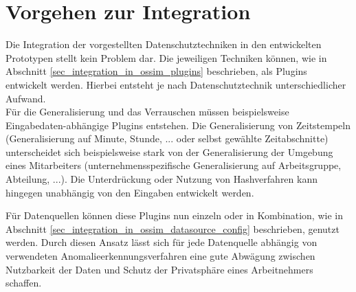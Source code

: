 \section{Vorgehen zur Integration}

Die Integration der vorgestellten Datenschutztechniken in den entwickelten Prototypen stellt kein Problem dar. Die jeweiligen Techniken können, wie in Abschnitt \ref{sec_integration_in_ossim_plugins} beschrieben, als Plugins entwickelt werden. Hierbei entsteht je nach Datenschutztechnik unterschiedlicher Aufwand.\\
Für die Generalisierung und das Verrauschen müssen beispielsweise Eingabedaten-abhängige Plugins entstehen. Die Generalisierung von Zeitstempeln (Generalisierung auf Minute, Stunde, ... oder selbst gewählte Zeitabschnitte) unterscheidet sich beispielsweise stark von der Generalisierung der Umgebung eines Mitarbeiters (unternehmensspezifische Generalisierung auf Arbeitsgruppe, Abteilung, ...). Die Unterdrückung oder Nutzung von Hashverfahren kann hingegen unabhängig von den Eingaben entwickelt werden.

Für Datenquellen können diese Plugins nun einzeln oder in Kombination, wie in Abschnitt \ref{sec_integration_in_ossim_datasource_config} beschrieben, genutzt werden. Durch diesen Ansatz lässt sich für jede Datenquelle abhängig von verwendeten Anomalieerkennungsverfahren eine gute Abwägung zwischen Nutzbarkeit der Daten und Schutz der Privatsphäre eines Arbeitnehmers schaffen.